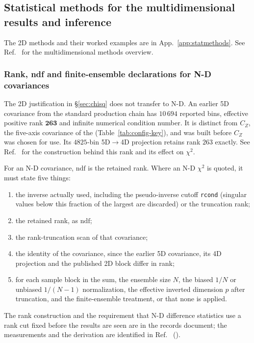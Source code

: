 \subsection{Statistical methods for the multidimensional results and inference}
\label{app:statmethods-nd}

The 2D methods and their worked examples are in App.~\ref{app:statmethods}. See Ref.~\cite{NoteRecords2026} for the multidimensional methods overview.

\subsubsection{Rank, ndf and finite-ensemble declarations for N-D covariances}
\label{sec:nd-declarations}

The 2D justification in \S\ref{sec:chisq} does not transfer to N-D. An earlier 5D covariance from the standard production chain has $10\,694$ reported bins, effective positive rank $\mathbf{263}$ and infinite numerical condition number. It is distinct from $C_Z$, the five-axis covariance of the \resFiveAxis{} (Table~\ref{tab:config-key}), and was built before $C_Z$ was chosen for use. Its $4825$-bin 5D$\to$4D projection retains rank $263$ exactly. See Ref.~\cite{NoteRecords2026} for the construction behind this rank and its effect on $\chi^{2}$.

For an N-D covariance, $\mathrm{ndf}$ is the retained rank. Where an N-D $\chi^{2}$ is quoted, it must state five things:
\begin{enumerate}[label=(\roman*)]
\item the inverse actually used, including the pseudo-inverse cutoff \texttt{rcond} (singular values below this fraction of the largest are discarded) or the truncation rank;
\item the retained rank, as $\mathrm{ndf}$;
\item the rank-truncation scan of that covariance;
\item the identity of the covariance, since the earlier 5D covariance, its 4D projection and the published 2D block differ in rank;
\item for each sample block in the sum, the ensemble size $N$, the biased $1/N$ or unbiased $1/(N-1)$ normalization, the effective inverted dimension $p$ after truncation, and the finite-ensemble treatment, or that none is applied.
\end{enumerate}
The rank construction and the requirement that N-D difference statistics use a rank cut fixed before the results are seen are in the records document; the measurements and the derivation are identified in Ref.~\cite{NoteRecords2026} ().

